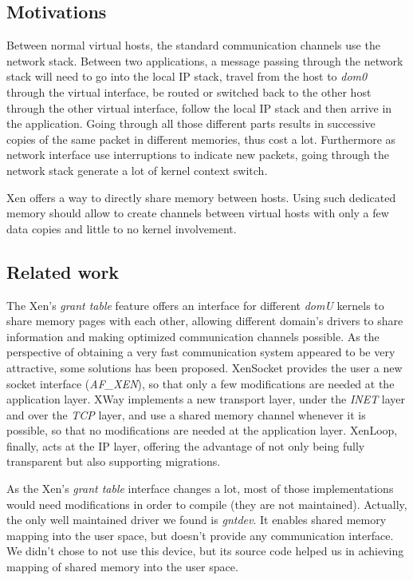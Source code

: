 \documentclass[journal]{IEEEtran}
\begin{document}
\subsection{Motivations}

Between normal virtual hosts, the standard communication channels use the network stack.
Between two applications, a message passing through the network stack will need to go into the local IP stack, travel from the host to \emph{dom0} through the virtual interface, be routed or switched back to the other host through the other virtual interface, follow the local IP stack and then arrive in the application.
Going through all those different parts results in successive copies of the same packet in different memories, thus cost a lot.
Furthermore as network interface use interruptions to indicate new packets, going through the network stack generate a lot of kernel context switch.



Xen offers a way to directly share memory between hosts.
Using such dedicated memory should allow to create channels between virtual hosts with only a few data copies and little to no kernel involvement.

\subsection{Related work}

The Xen's \emph{grant table} feature offers an interface for different \emph{domU} kernels to share memory pages with each other, allowing different domain's drivers to share information and making optimized communication channels possible. As the perspective of obtaining a very fast communication system appeared to be very attractive, some solutions has been proposed. XenSocket\cite{XenSocket} provides the user a new socket interface (\emph{AF\_XEN}), so that only a few modifications are needed at the application layer. XWay\cite{XWay} implements a new transport layer, under the \emph{INET} layer and over the \emph{TCP} layer, and use a shared memory channel whenever it is possible, so that no modifications are needed at the application layer. XenLoop\cite{XenLoop}, finally, acts at the IP layer, offering the advantage of not only being fully transparent but also supporting migrations. 

As the Xen's \emph{grant table} interface changes a lot, most of those implementations would need modifications in order to compile (they are not maintained). Actually, the only well maintained driver we found is \emph{gntdev}. It enables shared memory mapping into the user space, but doesn't provide any communication interface. 
We didn't chose to not use this device, but its source code helped us in achieving mapping of shared memory into the user space. 
\end{document}
